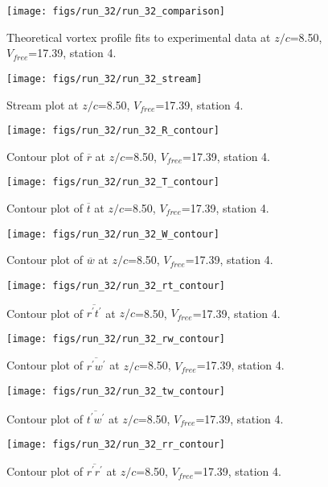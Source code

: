 \begin{figure}[H]
\centering
\texttt{[image: figs/run\_32/run\_32\_comparison]}
\caption{Theoretical vortex profile fits to experimental data at $z/c$=8.50, $V_{free}$=17.39, station 4.}
\end{figure}


\begin{figure}[H]
\centering
\texttt{[image: figs/run\_32/run\_32\_stream]}
\caption{Stream plot at $z/c$=8.50, $V_{free}$=17.39, station 4.}
\end{figure}


\begin{figure}[H]
\centering
\texttt{[image: figs/run\_32/run\_32\_R\_contour]}
\caption{Contour plot of $\overline{r}$ at $z/c$=8.50, $V_{free}$=17.39, station 4.}
\end{figure}


\begin{figure}[H]
\centering
\texttt{[image: figs/run\_32/run\_32\_T\_contour]}
\caption{Contour plot of $\overline{t}$ at $z/c$=8.50, $V_{free}$=17.39, station 4.}
\end{figure}


\begin{figure}[H]
\centering
\texttt{[image: figs/run\_32/run\_32\_W\_contour]}
\caption{Contour plot of $\overline{w}$ at $z/c$=8.50, $V_{free}$=17.39, station 4.}
\end{figure}


\begin{figure}[H]
\centering
\texttt{[image: figs/run\_32/run\_32\_rt\_contour]}
\caption{Contour plot of $\overline{r^\prime t^\prime}$ at $z/c$=8.50, $V_{free}$=17.39, station 4.}
\end{figure}


\begin{figure}[H]
\centering
\texttt{[image: figs/run\_32/run\_32\_rw\_contour]}
\caption{Contour plot of $\overline{r^\prime w^\prime}$ at $z/c$=8.50, $V_{free}$=17.39, station 4.}
\end{figure}


\begin{figure}[H]
\centering
\texttt{[image: figs/run\_32/run\_32\_tw\_contour]}
\caption{Contour plot of $\overline{t^\prime w^\prime}$ at $z/c$=8.50, $V_{free}$=17.39, station 4.}
\end{figure}


\begin{figure}[H]
\centering
\texttt{[image: figs/run\_32/run\_32\_rr\_contour]}
\caption{Contour plot of $\overline{r^\prime r^\prime}$ at $z/c$=8.50, $V_{free}$=17.39, station 4.}
\end{figure}


